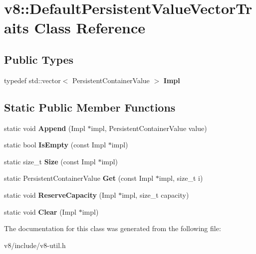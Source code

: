 \hypertarget{classv8_1_1DefaultPersistentValueVectorTraits}{}\section{v8\+:\+:Default\+Persistent\+Value\+Vector\+Traits Class Reference}
\label{classv8_1_1DefaultPersistentValueVectorTraits}
\subsection*{Public Types}
\begin{DoxyCompactItemize}
\item 
\mbox{\label{classv8_1_1DefaultPersistentValueVectorTraits_ac5093f7deea6cfc8672c529be4afdef4}} 
typedef std\+::vector$<$ Persistent\+Container\+Value $>$ {\bfseries Impl}
\end{DoxyCompactItemize}
\subsection*{Static Public Member Functions}
\begin{DoxyCompactItemize}
\item 
\mbox{\label{classv8_1_1DefaultPersistentValueVectorTraits_ac3088f4b37e68ca9ed668a859f89cf21}} 
static void {\bfseries Append} (Impl $\ast$impl, Persistent\+Container\+Value value)
\item 
\mbox{\label{classv8_1_1DefaultPersistentValueVectorTraits_a5b410d98817c143d2a3bf0e9dac34bd0}} 
static bool {\bfseries Is\+Empty} (const Impl $\ast$impl)
\item 
\mbox{\label{classv8_1_1DefaultPersistentValueVectorTraits_a49748bb910ea3482c078c1a8e566bd44}} 
static size\+\_\+t {\bfseries Size} (const Impl $\ast$impl)
\item 
\mbox{\label{classv8_1_1DefaultPersistentValueVectorTraits_ab9787aa7b041a30714cd17258c886cd7}} 
static Persistent\+Container\+Value {\bfseries Get} (const Impl $\ast$impl, size\+\_\+t i)
\item 
\mbox{\label{classv8_1_1DefaultPersistentValueVectorTraits_afda15875d9691152b30549e4dbe4eb95}} 
static void {\bfseries Reserve\+Capacity} (Impl $\ast$impl, size\+\_\+t capacity)
\item 
\mbox{\label{classv8_1_1DefaultPersistentValueVectorTraits_ab15a15e95f274defd3362536ae502361}} 
static void {\bfseries Clear} (Impl $\ast$impl)
\end{DoxyCompactItemize}


The documentation for this class was generated from the following file\+:\begin{DoxyCompactItemize}
\item 
v8/include/v8-\/util.\+h\end{DoxyCompactItemize}
